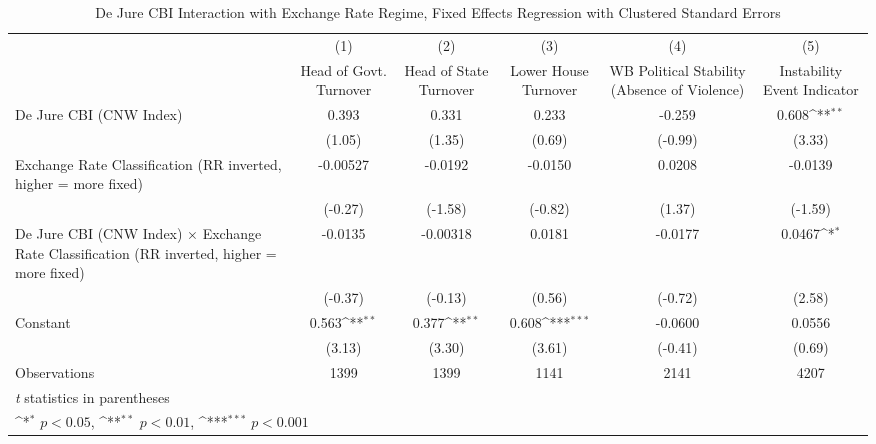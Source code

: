 \begin{table}[htbp]\centering
\def\sym#1{\ifmmode^{#1}\else\(^{#1}\)\fi}
\caption{De Jure CBI Interaction with Exchange Rate Regime, Fixed Effects Regression with Clustered Standard Errors \label{imultIndFEDJ}}
\begin{tabular*}{\linewidth}{@{\hskip\tabcolsep\extracolsep\fill}l*{5}{c}}
\hline\hline
                &\multicolumn{1}{c}{(1)}&\multicolumn{1}{c}{(2)}&\multicolumn{1}{c}{(3)}&\multicolumn{1}{c}{(4)}&\multicolumn{1}{c}{(5)}\\
                &\multicolumn{1}{c}{Head of Govt. Turnover}&\multicolumn{1}{c}{Head of State Turnover}&\multicolumn{1}{c}{Lower House Turnover}&\multicolumn{1}{c}{WB Political Stability (Absence of Violence)}&\multicolumn{1}{c}{Instability Event Indicator}\\
\hline
De Jure CBI (CNW Index)&    0.393         &    0.331         &    0.233         &   -0.259         &    0.608\sym{**} \\
                &   (1.05)         &   (1.35)         &   (0.69)         &  (-0.99)         &   (3.33)         \\
[1em]
Exchange Rate Classification (RR inverted, higher = more fixed)& -0.00527         &  -0.0192         &  -0.0150         &   0.0208         &  -0.0139         \\
                &  (-0.27)         &  (-1.58)         &  (-0.82)         &   (1.37)         &  (-1.59)         \\
[1em]
De Jure CBI (CNW Index) $\times$ Exchange Rate Classification (RR inverted, higher = more fixed)&  -0.0135         & -0.00318         &   0.0181         &  -0.0177         &   0.0467\sym{*}  \\
                &  (-0.37)         &  (-0.13)         &   (0.56)         &  (-0.72)         &   (2.58)         \\
[1em]
Constant        &    0.563\sym{**} &    0.377\sym{**} &    0.608\sym{***}&  -0.0600         &   0.0556         \\
                &   (3.13)         &   (3.30)         &   (3.61)         &  (-0.41)         &   (0.69)         \\
\hline
Observations    &     1399         &     1399         &     1141         &     2141         &     4207         \\
\hline\hline
\multicolumn{6}{l}{\footnotesize \textit{t} statistics in parentheses}\\
\multicolumn{6}{l}{\footnotesize \sym{*} \(p<0.05\), \sym{**} \(p<0.01\), \sym{***} \(p<0.001\)}\\
\end{tabular*}
\end{table}

